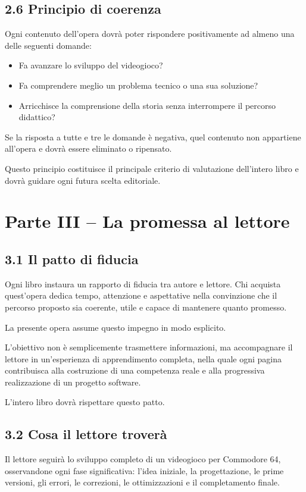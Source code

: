 \documentclass{article}
\begin{document}
\subsection{2.6 Principio di coerenza}
Ogni contenuto dell'opera dovrà poter rispondere positivamente ad almeno una delle seguenti domande:

\begin{itemize}
\item Fa avanzare lo sviluppo del videogioco?
\item Fa comprendere meglio un problema tecnico o una sua soluzione?
\item Arricchisce la comprensione della storia senza interrompere il percorso didattico?
\end{itemize}
Se la risposta a tutte e tre le domande è negativa, quel contenuto non appartiene all'opera e dovrà essere eliminato o
ripensato.

Questo principio costituisce il principale criterio di valutazione dell'intero libro e dovrà guidare ogni futura scelta
editoriale.

\section{Parte III – La promessa al lettore}
\subsection{3.1 Il patto di fiducia}
Ogni libro instaura un rapporto di fiducia tra autore e lettore. Chi acquista quest'opera dedica tempo, attenzione e
aspettative nella convinzione che il percorso proposto sia coerente, utile e capace di mantenere quanto promesso.

La presente opera assume questo impegno in modo esplicito.

L'obiettivo non è semplicemente trasmettere informazioni, ma accompagnare il lettore in un'esperienza di apprendimento
completa, nella quale ogni pagina contribuisca alla costruzione di una competenza reale e alla progressiva
realizzazione di un progetto software.

L'intero libro dovrà rispettare questo patto.

\subsection{3.2 Cosa il lettore troverà}
Il lettore seguirà lo sviluppo completo di un videogioco per Commodore 64, osservandone ogni fase significativa: l'idea
iniziale, la progettazione, le prime versioni, gli errori, le correzioni, le ottimizzazioni e il completamento finale.
\end{document}
